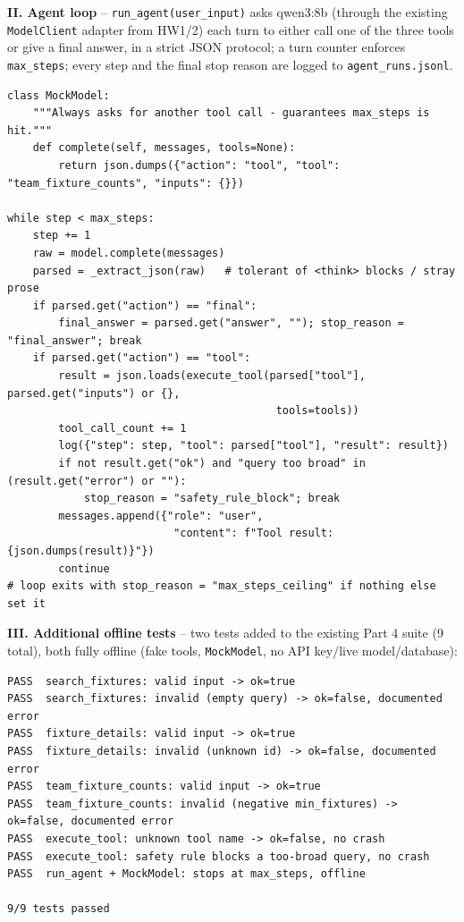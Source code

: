 \documentclass[11pt]{article}
\begin{document}
\textbf{II. Agent loop} -- \verb|run_agent(user_input)| asks qwen3:8b
(through the existing \verb|ModelClient| adapter from HW1/2) each turn to
either call one of the three tools or give a final answer, in a strict
JSON protocol; a turn counter enforces \verb|max_steps|; every step and the
final stop reason are logged to \verb|agent_runs.jsonl|.

\begin{lstlisting}
class MockModel:
    """Always asks for another tool call - guarantees max_steps is hit."""
    def complete(self, messages, tools=None):
        return json.dumps({"action": "tool", "tool": "team_fixture_counts", "inputs": {}})

while step < max_steps:
    step += 1
    raw = model.complete(messages)
    parsed = _extract_json(raw)   # tolerant of <think> blocks / stray prose
    if parsed.get("action") == "final":
        final_answer = parsed.get("answer", ""); stop_reason = "final_answer"; break
    if parsed.get("action") == "tool":
        result = json.loads(execute_tool(parsed["tool"], parsed.get("inputs") or {},
                                          tools=tools))
        tool_call_count += 1
        log({"step": step, "tool": parsed["tool"], "result": result})
        if not result.get("ok") and "query too broad" in (result.get("error") or ""):
            stop_reason = "safety_rule_block"; break
        messages.append({"role": "user",
                          "content": f"Tool result: {json.dumps(result)}"})
        continue
# loop exits with stop_reason = "max_steps_ceiling" if nothing else set it
\end{lstlisting}

\textbf{III. Additional offline tests} -- two tests added to the existing
Part 4 suite (9 total), both fully offline (fake tools, \verb|MockModel|,
no API key/live model/database):

\begin{lstlisting}
PASS  search_fixtures: valid input -> ok=true
PASS  search_fixtures: invalid (empty query) -> ok=false, documented error
PASS  fixture_details: valid input -> ok=true
PASS  fixture_details: invalid (unknown id) -> ok=false, documented error
PASS  team_fixture_counts: valid input -> ok=true
PASS  team_fixture_counts: invalid (negative min_fixtures) -> ok=false, documented error
PASS  execute_tool: unknown tool name -> ok=false, no crash
PASS  execute_tool: safety rule blocks a too-broad query, no crash
PASS  run_agent + MockModel: stops at max_steps, offline

9/9 tests passed
\end{lstlisting}
\end{document}
